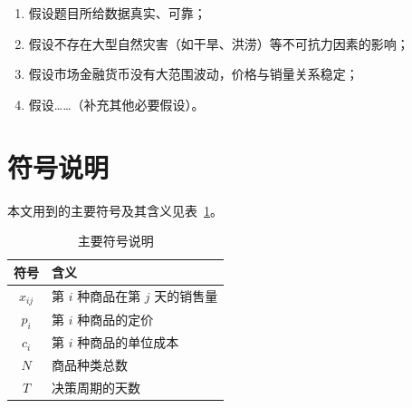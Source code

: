 \documentclass[a4paper, zihao=-4, fontset=windows]{ctexart}
\begin{document}
\begin{enumerate}
  \item 假设题目所给数据真实、可靠；
  \item 假设不存在大型自然灾害（如干旱、洪涝）等不可抗力因素的影响；
  \item 假设市场金融货币没有大范围波动，价格与销量关系稳定；
  \item 假设……（补充其他必要假设）。
\end{enumerate}

\section{符号说明}

本文用到的主要符号及其含义见表~\ref{tab:symbol}。

\begin{table}[htbp]
  \centering
  \caption{主要符号说明}
  \label{tab:symbol}
  \begin{tabular}{cl}
    \toprule
    符号 & 含义 \\
    \midrule
    $x_{ij}$ & 第 $i$ 种商品在第 $j$ 天的销售量 \\
    $p_i$   & 第 $i$ 种商品的定价 \\
    $c_i$   & 第 $i$ 种商品的单位成本 \\
    $N$     & 商品种类总数 \\
    $T$     & 决策周期的天数 \\
    \bottomrule
  \end{tabular}
\end{table}

\end{document}
